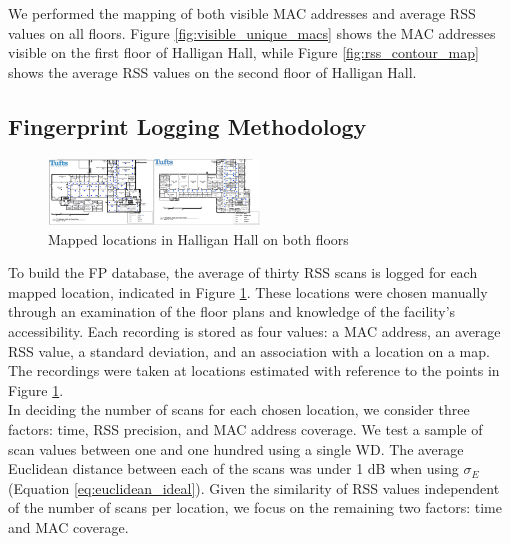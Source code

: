 \documentclass[conference]{IEEEtran}
\begin{document}
We performed the mapping of both visible MAC addresses and average RSS values on all floors. Figure \ref{fig:visible_unique_macs} shows the MAC addresses visible on the first floor of Halligan Hall, while Figure \ref{fig:rss_contour_map} shows the average RSS values on the second floor of Halligan Hall.

\subsection{Fingerprint Logging Methodology}

\begin{figure}[t!] 
  \centering
    \includegraphics[width=0.5\textwidth]{floorImage.png}
     \caption{Mapped locations in Halligan Hall on both floors}
     \label{fig:mapped_positions}
\end{figure}


To build the FP database, the average of thirty RSS scans is logged for each mapped location, indicated in Figure \ref{fig:mapped_positions}. These locations were chosen manually through an examination of the floor plans and knowledge of the facility's accessibility. Each recording is stored as four values: a MAC address, an average RSS value, a standard deviation, and an association with a location on a map. The recordings were taken at locations estimated with reference to the points in Figure \ref{fig:mapped_positions}.\\
\indent In deciding the number of scans for each chosen location, we consider three factors: time, RSS precision, and MAC address coverage. We test a sample of scan values between one and one hundred using a single WD. The average Euclidean distance between each of the scans was under 1 dB when using $\sigma_E$ (Equation \ref{eq:euclidean_ideal}). Given the similarity of RSS values independent of the number of scans per location, we focus on the remaining two factors: time and MAC coverage. 


\begin{table}[!t]
\renewcommand{\arraystretch}{1.3}
\caption{Floor Recording Times (average 1.5 sec/scan)}
\label{tab:table_floor_times}
\centering
{}
\end{table}
\end{document}
